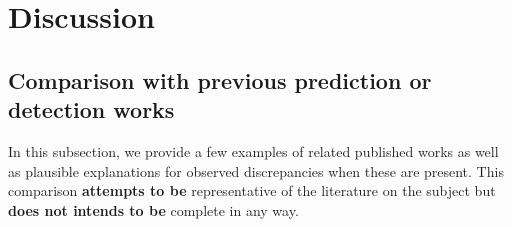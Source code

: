 \documentclass{aa}
\begin{document}
\begin{table*}
\setlength{\tabcolsep}{3pt}
\caption{Predicted and original properties for the $5$ sources in Stripe 82 with the highest predicted redshift on the unlabelled sources predicted to be Radio AGN. A description of the columns is presented in Appendix~\ref{sec:app_prediction_results}.}\label{table:pred_radio_AGN_unknown_S82}
\centering
{}
\end{table*}

\section{Discussion}\label{sec:discussion}

\subsection{Comparison with previous prediction or detection works}\label{sec:compare_previous_works}
In this subsection, we provide a few examples of related published works as well as plausible explanations for observed discrepancies when these are present. This comparison \textbf{attempts to be} representative of the literature on the subject but \textbf{does not intends to be} complete in any way.
\end{document}
